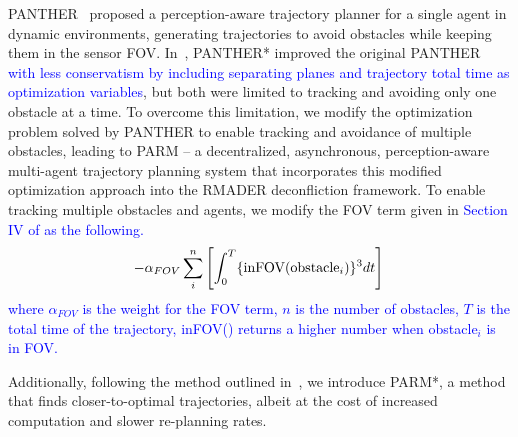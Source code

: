 PANTHER~\cite{tordesillas2021panther} proposed a perception-aware trajectory planner for a single agent in dynamic environments, generating trajectories to avoid obstacles while keeping them in the sensor FOV. In~\cite{tordesillas2023deep}, PANTHER* improved the original PANTHER \textcolor{blue}{with less conservatism by including separating planes and trajectory total time as optimization variables}, but both were limited to tracking and avoiding only one obstacle at a time.
%
To overcome this limitation, we modify the optimization problem solved by PANTHER to enable tracking and avoidance of multiple obstacles, leading to PARM -- a decentralized, asynchronous, perception-aware multi-agent trajectory planning system that incorporates this modified optimization approach into the RMADER deconfliction framework. To enable tracking multiple obstacles and agents, we modify the FOV term given in \textcolor{blue}{Section IV of \cite{tordesillas2021panther} as the following.}
%
\begin{equation}
    - \alpha_{FOV} \sum_{i}^{n} \left[ \int_{0}^{T} \{\text{inFOV}(\text{obstacle}_{i})\}^3 dt \right] \\
\end{equation}
%
\textcolor{blue}{where $\alpha_{FOV}$ is the weight for the FOV term, $n$ is the number of obstacles, $T$ is the total time of the trajectory, inFOV() returns a higher number when obstacle$_i$ is in FOV.}

Additionally, following the method outlined in~\cite{tordesillas2023deep}, we introduce PARM*, a method that finds closer-to-optimal trajectories, albeit at the cost of increased computation and slower re-planning rates.


